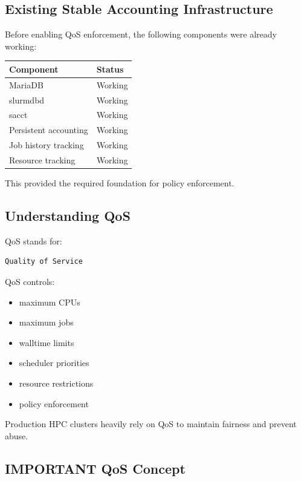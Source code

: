 \documentclass[11pt]{article}
\begin{document}
\subsection{Existing Stable Accounting Infrastructure}
\label{sec:org041ce05}

Before enabling QoS enforcement, the following components were already
working:

\begin{center}
\begin{tabular}{ll}
Component & Status\\
\hline
MariaDB & Working\\
slurmdbd & Working\\
sacct & Working\\
Persistent accounting & Working\\
Job history tracking & Working\\
Resource tracking & Working\\
\end{tabular}
\end{center}

This provided the required foundation for policy enforcement.
\subsection{Understanding QoS}
\label{sec:org7de303f}

QoS stands for:

\begin{verbatim}
Quality of Service
\end{verbatim}

QoS controls:

\begin{itemize}
\item maximum CPUs
\item maximum jobs
\item walltime limits
\item scheduler priorities
\item resource restrictions
\item policy enforcement
\end{itemize}

Production HPC clusters heavily rely on QoS to maintain fairness and
prevent abuse.
\subsection{IMPORTANT QoS Concept}
\label{sec:org7a5e25b}
\end{document}
